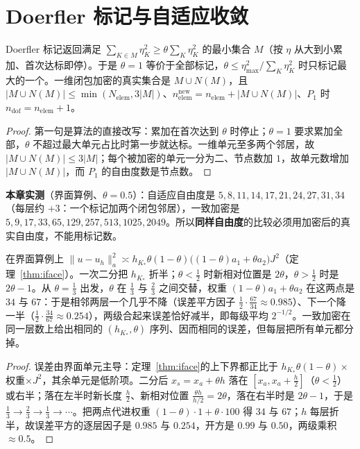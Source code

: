 \section{Doerfler 标记与自适应收敛}

\begin{theorem}[标记、闭包与自由度]
\label{thm:dorfler}
Doerfler 标记返回满足 $\sum_{K\in M}\eta_K^2\ge\theta\sum_K\eta_K^2$ 的最小集合 $M$（按 $\eta$
从大到小累加、首次达标即停）。于是 $\theta=1$ 等价于全部标记，$\theta\le\eta_{\max}^2/\sum_K\eta_K^2$
时只标记最大的一个。一维闭包加密的真实集合是 $M\cup N(M)$，且 $|M\cup
N(M)|\le\min(N_{\text{elem}},3|M|)$、$n_{\text{elem}}^{\text{new}}=n_{\text{elem}}+|M\cup
N(M)|$、$P_1$ 时 $n_{\text{dof}}=n_{\text{elem}}+1$。
\end{theorem}
\begin{proof}
第一句是算法的直接改写：累加在首次达到 $\theta$ 时停止；$\theta=1$ 要求累加全部，$\theta$ 不超过最大单元占比时第一步就达标。一维单元至多两个邻居，故
$|M\cup N(M)|\le3|M|$；每个被加密的单元一分为二、节点数加 $1$，故单元数增加 $|M\cup N(M)|$，而 $P_1$ 的自由度数是节点数。
\end{proof}

\textbf{本章实测}（界面算例、$\theta=0.5$）：自适应自由度是 $5,8,11,14,17,21,24,27,31,34$（每层约
$+3$：一个标记加两个闭包邻居），一致加密是
$5,9,17,33,65,129,257,513,1025,2049$。所以\textbf{同样自由度}的比较必须用加密后的真实自由度，不能用标记数。

\begin{theorem}[自适应为什么每两级减半]
\label{thm:adapt}
在界面算例上 $\|u-u_h\|_a^2\asymp h_{K_*}\theta(1-\theta)\bigl((1-\theta)a_1+\theta
a_2\bigr)J^2$（定理~\ref{thm:iface}）。一次二分把 $h_{K_*}$ 折半；$\theta<\frac12$ 时新相对位置是
$2\theta$，$\theta>\frac12$ 时是 $2\theta-1$。从 $\theta=\frac13$ 出发，$\theta$ 在 $\frac13$ 与 $\frac23$
之间交替，权重 $(1-\theta)a_1+\theta a_2$ 在这两点是 $34$ 与 $67$：于是相邻两层一个几乎不降（误差平方因子
$\frac12\cdot\frac{67}{34}\approx0.985$）、下一个降一半（$\frac12\cdot\frac{34}{67}\approx0.254$），两级合起来误差恰好减半，即每级平均
$2^{-1/2}$。一致加密在同一层数上给出相同的 $(h_{K_*},\theta)$ 序列、因而相同的误差，但每层把所有单元都分掉。
\end{theorem}
\begin{proof}
误差由界面单元主导：定理~\ref{thm:iface}的上下界都正比于 $h_{K_*}\theta(1-\theta)\times$权重$\times J^2$，其余单元是低阶项。二分后
$x_s=x_a+\theta h$ 落在 $[x_a,x_a+\frac h2]$（$\theta<\frac12$）或右半；落在左半时新长度 $\frac h2$、新相对位置
$\frac{\theta h}{h/2}=2\theta$，落在右半时是 $2\theta-1$，于是
$\frac13\to\frac23\to\frac13\to\cdots$。把两点代进权重 $(1-\theta)\cdot1+\theta\cdot100$ 得 $34$ 与
$67$；$h$ 每层折半，故误差平方的逐层因子是 $0.985$ 与 $0.254$，开方是 $0.99$ 与 $0.50$，两级乘积 $\approx0.5$。
\end{proof}

